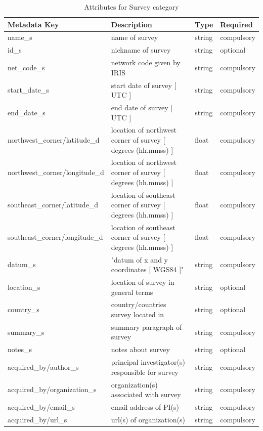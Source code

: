 \documentclass{article}
\begin{document}
\begin{table}[htb!]
	\caption[Attributes for Survey]{Attributes for Survey category}
	\begin{tabular}{|l|l|l|l|}
		\hline
		\textbf{Metadata Key} & \textbf{Description} & \textbf{Type} & \textbf{Required} \\ \hline
		name\_s & name of survey & string & compulsory \\ \hline
		id\_s & nickname of survey & string & optional \\ \hline
		net\_code\_s & network code given by IRIS & string & compulsory \\ \hline
		start\_date\_s & start date of survey [ UTC ] & string & compulsory \\ \hline
		end\_date\_s & end date of survey [ UTC ] & string & compulsory \\ \hline
		northwest\_corner/latitude\_d & location of northwest corner of survey [ degrees (hh.mmss) ] & float & compulsory \\ \hline
		northwest\_corner/longitude\_d & location of northwest corner of survey [ degrees (hh.mmss) ] & float & compulsory \\ \hline
		southeast\_corner/latitude\_d & location of southeast corner of survey  [ degrees (hh.mmss) ] & float & compulsory \\ \hline
		southeast\_corner/longitude\_d & location of southeast corner of survey  [ degrees (hh.mmss) ] & float & compulsory \\ \hline
		datum\_s & "datum of x and y coordinates [ WGS84 ]" & string & compulsory \\ \hline
		location\_s & location of survey in general terms & string & optional \\ \hline
		country\_s & country/countries survey located in & string & optional \\ \hline
		summary\_s & summary paragraph of survey & string & compulsory \\ \hline
		notes\_s & notes about survey & string & optional \\ \hline
		acquired\_by/author\_s & principal investigator(s) responsible for survey & string & compulsory \\ \hline
		acquired\_by/organization\_s & organization(s) associated with survey & string & compulsory \\ \hline
		acquired\_by/email\_s & email address of PI(s) & string & compulsory \\ \hline
		acquired\_by/url\_s & url(s) of organization(s) & string & compulsory \\ \hline

\end{tabular}
\end{table}
\end{document}
